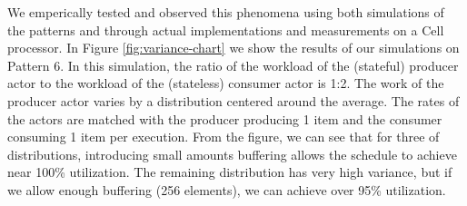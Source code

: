 We emperically tested and observed this phenomena using both
simulations of the patterns and through actual implementations and
measurements on a Cell processor.  In Figure \ref{fig:variance-chart}
we show the results of our simulations on Pattern 6.  In this
simulation, the ratio of the workload of the (stateful) producer actor
to the workload of the (stateless) consumer actor is 1:2. The work of
the producer actor varies by a distribution centered around the
average.  The rates of the actors are matched with the producer
producing 1 item and the consumer consuming 1 item per execution.
From the figure, we can see that for three of distributions,
introducing small amounts buffering allows the schedule to achieve
near 100\% utilization.  The remaining distribution has very high
variance, but if we allow enough buffering (256 elements), we can
achieve over 95\% utilization.


